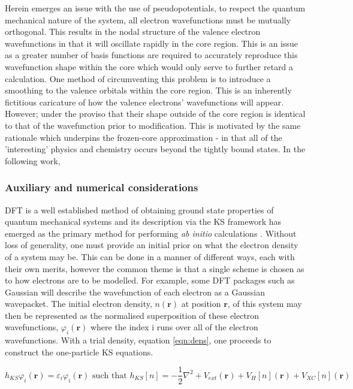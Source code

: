 Herein emerges an issue with the use of pseudopotentials, to respect the quantum mechanical nature of the system, all electron wavefunctions must be mutually orthogonal. This results in the nodal structure of the valence electron wavefunctions in that it will oscillate rapidly in the core region. This is an issue as a greater number of basis functions are required to accurately reproduce this wavefunction shape within the core which would only serve to further retard a calculation. One method of circumventing this problem is to introduce a smoothing to the valence orbitals within the core region. This is an inherently fictitious caricature of how the valence electrons' wavefunctions will appear. However; under the proviso that their shape outside of the core region is identical to that of the wavefunction prior to modification. This is motivated by the same rationale which underpins the frozen-core approximation - in that all of the 'interesting' physics and chemistry occurs beyond the tightly bound states. In the following work, 


\subsubsection{Auxiliary and numerical considerations}
\label{sec:dft_nums}

DFT is a well established method of obtaining ground state properties of quantum mechanical systems and its description via the KS framework has emerged as the primary method for performing \textit{ab initio} calculations \cite{K_Burke_Perspectives,Becke_Perspective}. Without loss of generality, one must provide an initial prior on what the electron density of a system may be. This can be done in a manner of different ways, each with their own merits, however the common theme is that a single scheme is chosen as to how electrons are to be modelled. For example, some DFT packages such as Gaussian will describe the wavefunction of each electron as a Gaussian wavepacket. The initial electron density, $n(\textbf{r})$ at position $\textbf{r}$, of this system may then be represented as the normalised superposition of these electron wavefunctions, ${\varphi_{i}(\textbf{r})}$ where the index i runs over all of the electron wavefunctions. With a trial density, equation \ref{eqn:dens}, one proceeds to construct the one-particle KS equations.

\begin{equation}
    h_{KS}\varphi_{i}(\textbf{r}) = \varepsilon_{i}\varphi_{i}(\textbf{r}) \text{ such that } h_{KS}[n] = -\frac{1}{2}\nabla^{2} + V_{ext}(\textbf{r}) + V_{H}[n](\textbf{r}) + V_{XC}[n](\textbf{r}) 
    \label{eqn:hKS}
\end{equation}

